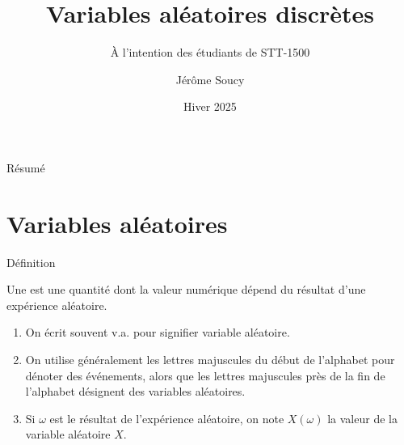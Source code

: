 \documentclass[nuit,charter,pied]{BeamerJS}
\title{Variables aléatoires discrètes}
\subtitle{À l'intention des étudiants de STT-1500}
\institute{Université Laval}
\author{Jérôme Soucy}
\date{Hiver 2025}
\begin{document}
\begin{frame}
	\titlepage
\end{frame}

\begin{frame}{Résumé}
\tableofcontents
\end{frame}
\section{Variables aléatoires}
\begin{frame}{Définition}
	\begin{defn}{}
		Une  est une quantité dont la valeur numérique dépend du résultat d'une expérience aléatoire.
	\end{defn}\pause
	\begin{rems}
	\begin{enumerate}
		\item On écrit souvent v.a. pour signifier variable aléatoire.\\ \pause
		\item On utilise généralement les lettres majuscules du début de l'alphabet pour dénoter des événements, alors que les lettres majuscules près de la fin de l'alphabet désignent des variables aléatoires.\\ \pause
		\item Si $\omega$ est le résultat de l'expérience aléatoire, on note $X(\omega)$ la valeur de la variable aléatoire $X$.
	\end{enumerate}
	\end{rems}
\end{frame}
\end{document}
